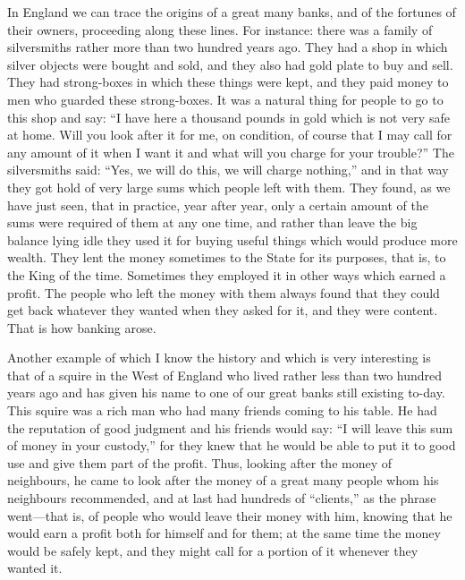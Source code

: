\documentclass{book}
\begin{document}
In England we can trace the origins of a great many banks, and of the fortunes of their owners, proceeding along these lines. For instance: there was a family of silversmiths rather more than two hundred years ago. They had a shop in which silver objects were bought and sold, and they also had gold plate to buy and sell. They had strong-boxes in which these things were kept, and they paid money to men who guarded these strong-boxes. It was a natural thing for people to go to this shop and say: “I have here a thousand pounds in gold which is not very safe at home. Will you look after it for me, on condition, of course that I may call for any amount of it when I want it and what will you charge for your trouble?” The silversmiths said: “Yes, we will do this, we will charge nothing,” and in that way they got hold of very large sums which people left with them. They found, as we have just seen, that in practice, year after year, only a certain amount of the sums were required of them at any one time, and rather than leave the big balance lying idle they used it for buying useful things which would produce more wealth. They lent the money sometimes to the State for its purposes, that is, to the King of the time. Sometimes they employed it in other ways which earned a profit. The people who left the money with them always found that they could get back whatever they wanted when they asked for it, and they were content. That is how banking arose.

Another example of which I know the history and which is very interesting is that of a squire in the West of England who lived rather less than two hundred years ago and has given his name to one of our great banks still existing to-day. This squire was a rich man who had many friends coming to his table. He had the reputation of good judgment and his friends would say: “I will leave this sum of money in your custody,” for they knew that he would be able to put it to good use and give them part of the profit. Thus, looking after the money of neighbours, he came to look after the money of a great many people whom his neighbours recommended, and at last had hundreds of “clients,” as the phrase went—that is, of people who would leave their money with him, knowing that he would earn a profit both for himself and for them; at the same time the money would be safely kept, and they might call for a portion of it whenever they wanted it.
\end{document}
